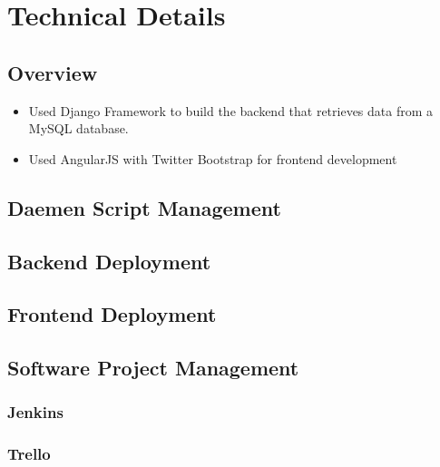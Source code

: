 \chapter{Technical Details}

\section{Overview}
\begin{itemize}
\item Used Django Framework to build the backend that retrieves data from a MySQL database.

\item Used AngularJS with Twitter Bootstrap for frontend development
\end{itemize}

\section{Daemen Script Management}

\section{Backend Deployment}

\section{Frontend Deployment}


\section{Software Project Management}
\subsection{Jenkins}
\subsection{Trello}
